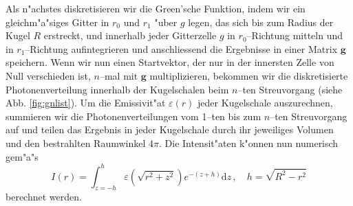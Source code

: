 	Als n"achstes diskretisieren wir die Green'sche Funktion, indem wir ein gleichm"a"siges Gitter in $r_0$ und $r_1$ "uber $g$ legen, das sich bis zum Radius der Kugel $R$ erstreckt, und innerhalb jeder Gitterzelle $g$ in $r_0$--Richtung mitteln und in $r_1$--Richtung aufintegrieren und anschliessend die Ergebnisse in einer Matrix $\mathbf{g}$ speichern. Wenn wir nun einen Startvektor, der nur in der innersten Zelle von Null verschieden ist, $n$--mal mit $\mathbf{g}$ multiplizieren, bekommen wir die diskretisierte Photonenverteilung innerhalb der Kugelschalen beim $n$--ten Streuvorgang (siehe Abb. \ref{fig:gnlist}). Um die Emissivit"at $\varepsilon(r)$ jeder Kugelschale auszurechnen, summieren wir die Photonenverteilungen vom 1--ten bis zum $n$--ten Streuvorgang auf und teilen das Ergebnis in jeder Kugelschale durch ihr jeweiliges Volumen und den bestrahlten Raumwinkel $4\pi$. Die Intensit"aten k"onnen nun numerisch gem"a"s
	\begin{equation}
		I(r) = \int_{z=-h}^h \varepsilon\left(\sqrt{r^2+z^2}\right) e^{-(z+h)}\text{d}z\,,\quad h=\sqrt{R^2-r^2}
		\label{eq:testprob_intensity_calculation}
	\end{equation}
	berechnet werden.
	
	
	
	\vfill
	\pagebreak
